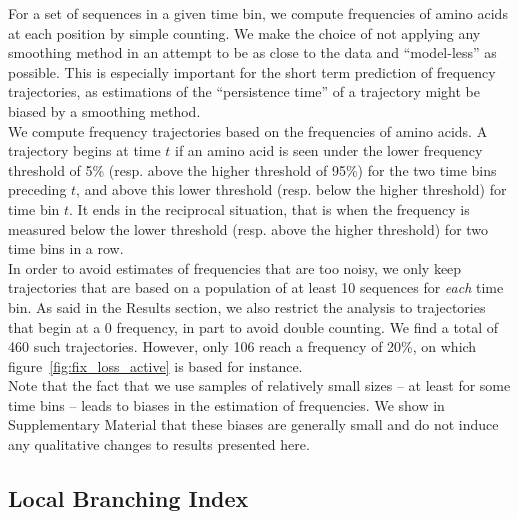 \documentclass[reprint,amsmath,amssymb,superscriptaddress,showpacs,rmp]{revtex4-1}
\begin{document}
	For a set of sequences in a given time bin, we compute frequencies of amino acids at each position by simple counting. We make the choice of not applying any smoothing method in an attempt to be as close to the data and ``model-less'' as possible. This is especially important for the short term prediction of frequency trajectories, as estimations of the ``persistence time'' of a trajectory might be biased by a smoothing method. \\
	We compute frequency trajectories based on the frequencies of amino acids. A trajectory begins at time $t$ if an amino acid is seen under the lower frequency threshold of 5\% (resp. above the higher threshold of 95\%) for the two time bins preceding $t$, and above this lower threshold (resp. below the higher threshold) for time bin $t$. It ends in the reciprocal situation, that is when the frequency is measured below the lower threshold (resp. above the higher threshold) for two time bins in a row. \\
	In order to avoid estimates of frequencies that are too noisy, we only keep trajectories that are based on a population of at least 10 sequences for \emph{each} time bin. As said in the Results section, we also restrict the analysis to trajectories that begin at a $0$ frequency, in part to avoid double counting. We find a total of 460 such trajectories. However, only 106 reach a frequency of 20\%, on which figure~\ref{fig:fix_loss_active} is based for instance.  \\
	Note that the fact that we use samples of relatively small sizes -- at least for some time bins -- leads to biases in the estimation of frequencies. We show in Supplementary Material that these biases are generally small and do not induce any qualitative changes to results presented here.


\subsection*{Local Branching Index} %
\label{sub:local_branching_index}
\end{document}
